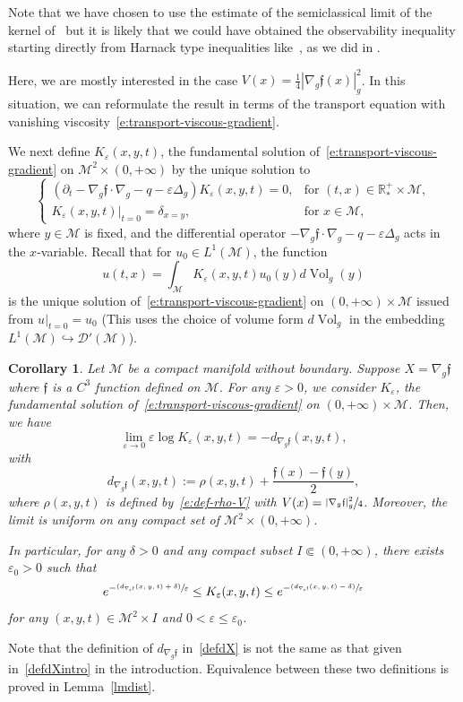 \documentclass[JEP,XML,SOM,Unicode]{cedram}
\newcommand{\psfrac}[2]{\sfrac{(#1)}{#2}}
\newtheorem{corollary}[lemma]{Corollary}
\theoremstyle{definition}
\newcommand{\M}{\ensuremath{\mathcal M}}
\newcommand{\mb}[1]{\ensuremath{\mathbb{#1}}}
\newcommand{\R}{{\mb{R}}}
\newcommand{\f}{\ensuremath{\mathfrak{f}}}
\DeclareMathOperator{\Vol}{Vol}
\newcommand\nablag{\nabla_{g}}
\let\d\partial
\let\e\varepsilon
\let\eps\varepsilon
\let\q q
\begin{document}
Note that we have chosen to use the estimate of the semiclassical limit of the kernel of~\cite{LY86} but it is likely that we could have obtained the observability inequality starting directly from Harnack type inequalities like~\cite[Th.\,2.1]{LY86}, as we did in \cite{LL:18}.

Here, we are mostly interested in the case $V(x) = \frac14 |\nabla_g \f(x)|_g^2$. In this situation, we can reformulate the result in terms of the transport equation with vanishing viscosity~\eqref{e:transport-viscous-gradient}.

We next define $K_{\e}(x,y,t)$, the fundamental solution of~\eqref{e:transport-viscous-gradient} on $\M^2\times(0,+\infty)$ by the unique solution to
\begin{equation}
\label{e:transport-viscous-kernel}
\begin{cases}
(\d_t - \nablag \f \cdot \nablag -\q - \eps \Delta_g ) K_{\e}(x,y,t)= 0, & \text{for } (t,x) \in \R^+_*\times \M, \\
K_{\e}(x,y,t) |_{t=0} = \delta_{x=y}, & \text{for } x \in \M,
\end{cases}
\end{equation}
where $y \in \M$ is fixed, and the differential operator $- \nablag \f \cdot \nablag -\q - \eps \Delta_g$ acts in the $x$-variable.
Recall that for $u_0 \in L^1(\M)$, the function
\[
u(t,x) = \int_\M K_\eps(x,y,t)u_0(y) d\Vol_g(y)
\]
is the unique solution of~\eqref{e:transport-viscous-gradient} on $(0,+\infty)\times \M$ issued from $u|_{t=0} = u_0$ (This uses the choice of volume form $d\Vol_g$ in the embedding $L^1(\M) \hookrightarrow \mathcal{D}'(\M)$).

\begin{corollary}
\label{corLiYauconj}
Let $\M$ be a compact manifold without boundary. Suppose \hbox{$X\!=\!\nabla_g \f$} where $\f$ is a $C^3$ function defined on $\M$. For any $\e>0$, we consider $K_{\e}$, the fundamental solution of~\eqref{e:transport-viscous-gradient} on $(0,+\infty)\times \M$. Then, we have
\[
\underset{\e\to 0}{\lim}\e \log K_{\e}(x,y, t)=-d_{\nablag \f}(x,y,t),
\]
with
\begin{equation}
\label{defdX}
d_{\nablag \f}(x,y,t) := \rho(x,y,t)+ \frac{\f(x)-\f(y)}{2},
\end{equation}
where $\rho(x,y,t)$ is defined by~\eqref{e:def-rho-V} with $V(x) = \sfrac{|\nabla_g \f|_g^2}{4}$.
Moreover, the limit is uniform on any compact set of $\M^2 \times (0,+\infty)$.

In particular, for any $\delta>0$ and any compact subset $I \Subset (0,+\infty)$, there exists $\e_0>0$ such that
\begin{equation}
\label{inegkernel}
e^{-\psfrac{d_{\nablag \f}(x,y,t)+\delta}{\e}}\leq K_{\e}(x,y,t)\leq e^{-\psfrac{d_{\nablag \f}(x,y,t)-\delta}{\e}}
\end{equation}
for any $(x,y,t)\in \M^2 \times I$ and $0<\e\leq \e_0$.
\end{corollary}
Note that the definition of $d_{\nablag \f}$ in~\eqref{defdX} is not the same as that given in~\eqref{defdXintro} in the introduction. Equivalence between these two definitions is proved in Lemma~\ref{lmdist}.
\end{document}
